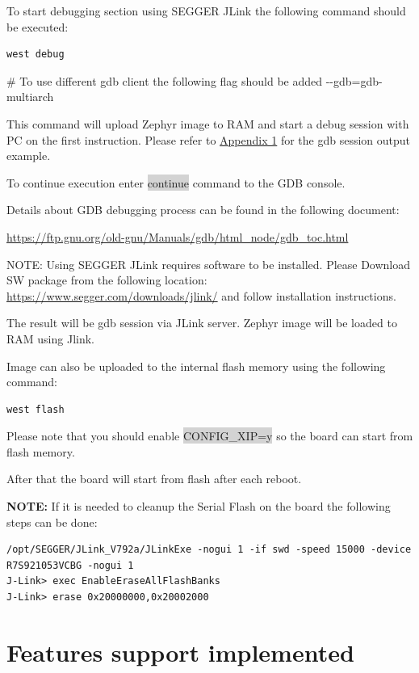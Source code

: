 \documentclass[11pt,a4paper,oneside]{article}
\begin{document}
To start debugging section using SEGGER JLink the following command
should be executed:

\begin{lstlisting}
west debug
\end{lstlisting}

\# To use different gdb client the following flag should be added
-\/-gdb=gdb-multiarch

This command will upload Zephyr image to RAM and start a debug session
with PC on the first instruction. Please refer to
\hyperref[appendix-1.-gdb-debug-session-output]{Appendix 1} for the gdb
session output example.

To continue execution enter \colorbox{lightgray}{continue} command to the GDB console.

Details about GDB debugging process can be found in the following
document:

\url{https://ftp.gnu.org/old-gnu/Manuals/gdb/html_node/gdb_toc.html}

NOTE: Using SEGGER JLink requires software to be installed. Please
Download SW package from the following location:
\url{https://www.segger.com/downloads/jlink/} and follow installation
instructions.

The result will be gdb session via JLink server. Zephyr image will be
loaded to RAM using Jlink.

Image can also be uploaded to the internal flash memory using the
following command:

\begin{lstlisting}
west flash
\end{lstlisting}

Please note that you should enable \colorbox{lightgray}{CONFIG\_XIP=y} so the board can
start from flash memory.

After that the board will start from flash after each reboot.

\textbf{NOTE:} If it is needed to cleanup the Serial Flash on the board the following
steps can be done:

\begin{lstlisting}
/opt/SEGGER/JLink_V792a/JLinkExe -nogui 1 -if swd -speed 15000 -device
R7S921053VCBG -nogui 1
J-Link> exec EnableEraseAllFlashBanks
J-Link> erase 0x20000000,0x20002000
\end{lstlisting}

\section{Features support
implemented}\label{features-support-implemented}
\end{document}
